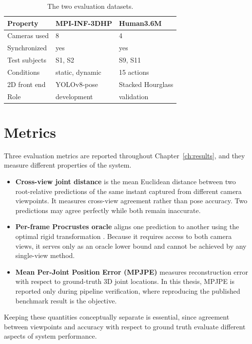 \documentclass[12pt,a4paper]{report}
\begin{document}
\begin{table}[H]
\centering
\caption{The two evaluation datasets.}
\label{tab:datasets}
\begin{tabular}{lll}
\toprule
\textbf{Property} & \textbf{MPI-INF-3DHP} & \textbf{Human3.6M} \\
\midrule
Cameras used & 8 & 4 \\
Synchronized & yes & yes \\
Test subjects & S1, S2 & S9, S11 \\
Conditions & static, dynamic & 15 actions \\
2D front end & YOLOv8-pose \cite{yolov8} & Stacked Hourglass \cite{hourglass} \\
Role & development & validation \\
\bottomrule
\end{tabular}
\end{table}

\section{Metrics}

Three evaluation metrics are reported throughout Chapter~\ref{ch:results}, and they measure different properties of the system.

\begin{itemize}
\item \textbf{Cross-view joint distance} is the mean Euclidean distance between two root-relative predictions of the same instant captured from different camera viewpoints. It measures cross-view agreement rather than pose accuracy. Two predictions may agree perfectly while both remain inaccurate.

\item \textbf{Per-frame Procrustes oracle} aligns one prediction to another using the optimal rigid transformation \cite{kabsch}. Because it requires access to both camera views, it serves only as an oracle lower bound and cannot be achieved by any single-view method.

\item \textbf{Mean Per-Joint Position Error (MPJPE)} measures reconstruction error with respect to ground-truth 3D joint locations. In this thesis, MPJPE is reported only during pipeline verification, where reproducing the published benchmark result is the objective.
\end{itemize}

Keeping these quantities conceptually separate is essential, since agreement between viewpoints and accuracy with respect to ground truth evaluate different aspects of system performance.
\end{document}

